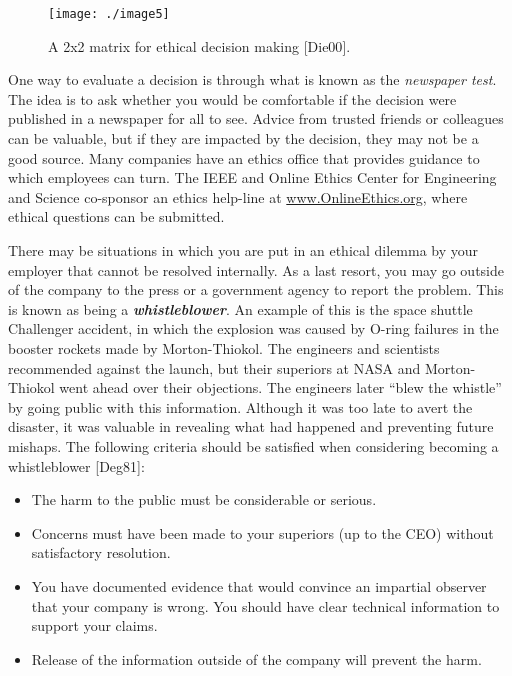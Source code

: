 \begin{figure}[h]
\texttt{[image: ./image5]}
\caption{A 2x2 matrix for ethical decision making {[}Die00{]}.}
\label{figure:ethics2by2Matrix}
\end{figure}

One way to evaluate a decision is through what is known as the
\emph{newspaper test}. The idea is to ask whether you would be
comfortable if the decision were published in a newspaper for all to
see. Advice from trusted friends or colleagues can be valuable, but if
they are impacted by the decision, they may not be a good source. Many
companies have an ethics office that provides guidance to which
employees can turn. The IEEE and Online Ethics Center for Engineering
and Science co-sponsor an ethics help-line at
\href{http://www.OnlineEthics.org}{www.OnlineEthics.org}, where ethical
questions can be submitted.

There may be situations in which you are put in an ethical dilemma by
your employer that cannot be resolved internally. As a last resort, you
may go outside of the company to the press or a government agency to
report the problem. This is known as being a
\emph{\textbf{whistleblower}}. An example of this is the space shuttle
Challenger accident, in which the explosion was caused by O-ring
failures in the booster rockets made by Morton-Thiokol. The engineers
and scientists recommended against the launch, but their superiors at
NASA and Morton-Thiokol went ahead over their objections. The engineers
later ``blew the whistle'' by going public with this information.
Although it was too late to avert the disaster, it was valuable in
revealing what had happened and preventing future mishaps. The following
criteria should be satisfied when considering becoming a whistleblower
{[}Deg81{]}:

\begin{itemize}
\item
  The harm to the public must be considerable or serious.
\item
  Concerns must have been made to your superiors (up to the CEO) without
  satisfactory resolution.
\item
  You have documented evidence that would convince an impartial observer
  that your company is wrong. You should have clear technical
  information to support your claims.
\item
  Release of the information outside of the company will prevent the
  harm.
\end{itemize}

